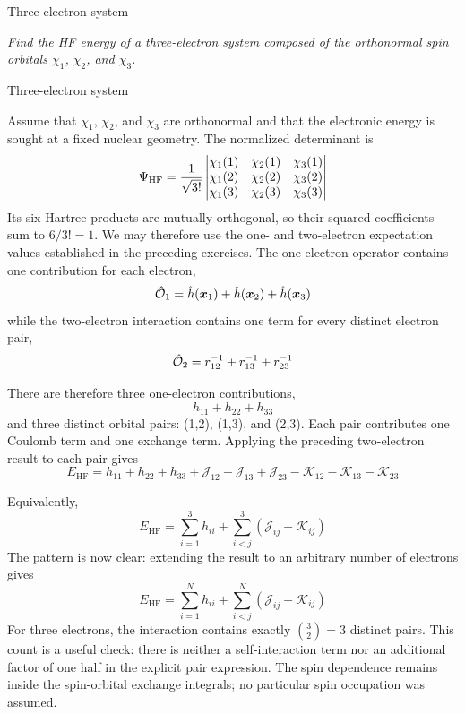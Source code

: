 \documentclass[11pt,a4paper,titlepage]{article}
\numberwithin{equation}{section}
\newcommand{\bx}{\boldsymbol{x}}
\newcommand{\hh}{\Hat{h}}
\newcommand{\chO}{\Hat{\mathcal{O}}}
\newcommand{\cJ}{\mathcal{J}}
\newcommand{\cK}{\mathcal{K}}
\newcommand{\violet}[1]{\textcolor{hfViolet}{#1}}
\begin{document}
\begin{hfexercise}{Three-electron system}

\violet{\textit{Find the HF energy of a three-electron system composed of
the orthonormal spin orbitals $\chi_1$, $\chi_2$, and $\chi_3$.}}

\end{hfexercise}
\begin{hfsolution}{Three-electron system}

Assume that $\chi_1$, $\chi_2$, and $\chi_3$ are orthonormal and that
the electronic energy is sought at a fixed nuclear geometry. The
normalized determinant is
\begin{equation}
  \Psi_\text{HF}
  =\frac{1}{\sqrt{3!}}
  \mdet{
    \chi_1(1)&\chi_2(1)&\chi_3(1)\\
    \chi_1(2)&\chi_2(2)&\chi_3(2)\\
    \chi_1(3)&\chi_2(3)&\chi_3(3)
  }
\end{equation}
Its six Hartree products are mutually orthogonal, so their squared
coefficients sum to $6/3!=1$. We may therefore use the one- and
two-electron expectation values established in the preceding exercises.
The one-electron operator contains one contribution for each electron,
\begin{equation}
  \chO_1
  =
  \hh(\bx_1)
  +
  \hh(\bx_2)
  +
  \hh(\bx_3)
\end{equation}
while the two-electron interaction contains one term for every distinct
electron pair,
\begin{equation}
  \chO_2
  =
  r_{12}^{-1}
  +
  r_{13}^{-1}
  +
  r_{23}^{-1}
\end{equation}

There are therefore three one-electron contributions,
\begin{equation}
  h_{11}+h_{22}+h_{33}
\end{equation}
and three distinct orbital pairs: (1,2), (1,3), and (2,3).
Each pair contributes one Coulomb term and one exchange term. Applying the
preceding two-electron result to each pair gives
\begin{equation}
  E_\text{HF}
  =
  h_{11}+h_{22}+h_{33}
  +
  \cJ_{12}+\cJ_{13}+\cJ_{23}
  -
  \cK_{12}-\cK_{13}-\cK_{23}
  \label{eq:three-electron-hf-energy}
\end{equation}

Equivalently,
\begin{equation}
  E_\text{HF}
  =
  \sum_{i=1}^{3}h_{ii}
  +
  \sum_{i<j}^{3}
  (\cJ_{ij}-\cK_{ij})
\end{equation}
The pattern is now clear: extending the result to an arbitrary number of
electrons gives
\begin{equation}
  E_\text{HF}
  =
  \sum_{i=1}^{N}h_{ii}
  +
  \sum_{i<j}^{N}
  (\cJ_{ij}-\cK_{ij})
\end{equation}
For three electrons, the interaction contains exactly
$\binom{3}{2}=3$ distinct pairs. This count is a useful check: there is
neither a self-interaction term nor an additional factor of one half in
the explicit pair expression. The spin dependence remains inside the
spin-orbital exchange integrals; no particular spin occupation was assumed.

\end{hfsolution}
\end{document}
